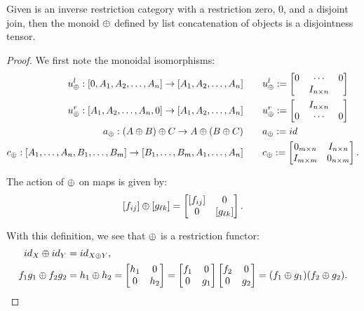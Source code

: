 \begin{lemma}\label{lem:imat_is_disjoint_tensor_category}
  Given \X is an inverse restriction category with a restriction zero, $0$, and a disjoint join,
  then the monoid $\oplus$ defined by list concatenation of objects is a disjointness tensor.
\end{lemma}
\begin{proof}
  We first note the monoidal isomorphisms:
  \begin{align*}
    u_{\oplus}^l : [0,A_1,A_2,\ldots,A_n] \to [A_1,A_2,\ldots,A_n] \qquad& u_{\oplus}^l :=
    \begin{bmatrix}
      0&\cdots&0 \\
      & I_{n\times n}
    \end{bmatrix}\\
    u_{\oplus}^r : [A_1,A_2,\ldots,A_n,0] \to [A_1,A_2,\ldots,A_n] \qquad & u_{\oplus}^r :=
    \begin{bmatrix}
      & I_{n\times n} \\
      0&\cdots&0
    \end{bmatrix} \\
    a_{\oplus} : (A\oplus B)\oplus C \to A\oplus (B\oplus C) \qquad &a_{\oplus} := id \\
    c_{\oplus} : [A_1,\ldots,A_n,B_1,\ldots,B_m] \to [B_1,\ldots,B_m,A_1,\ldots,A_n]  \qquad &
      c_{\oplus} := \begin{bmatrix}
                      0_{m\times n} & I_{n\times n} \\
                      I_{m\times m} & 0_{n\times m}
                \end{bmatrix}.
  \end{align*}

  The action of $\oplus$ on maps is given by:
  \[
    [f_{ij}]\oplus [g_{\ell k}] = \begin{bmatrix}
      [f_{ij}] & 0 \\
      0 & [g_{\ell k}]
      \end{bmatrix}.
  \]

  With this definition, we see that $\oplus$ is a restriction functor:
  \begin{align*}
    id_X \oplus id_Y &= id_{X\oplus Y}, \\
    f_1 g_1 \oplus f_2 g_2 &= h_1 \oplus h_2 =
    \begin{bmatrix}
      h_1 & 0 \\ 0 & h_2
    \end{bmatrix} =
    \begin{bmatrix}
      f_1 & 0 \\ 0 & g_1
    \end{bmatrix}
    \begin{bmatrix}
      f_2 & 0 \\ 0 & g_2
    \end{bmatrix} = (f_1 \oplus g_1) (f_2 \oplus g_2).
  \end{align*}


\end{proof}
